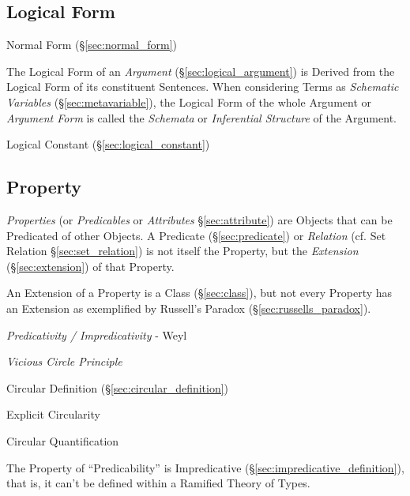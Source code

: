 \subsection{Logical Form}\label{sec:logical_form}

Normal Form (\S\ref{sec:normal_form})

The Logical Form of an \emph{Argument} (\S\ref{sec:logical_argument})
is Derived from the Logical Form of its constituent Sentences. When
considering Terms as \emph{Schematic Variables}
(\S\ref{sec:metavariable}), the Logical Form of the whole Argument or
\emph{Argument Form} is called the \emph{Schemata} or
\emph{Inferential Structure} of the Argument.



Logical Constant (\S\ref{sec:logical_constant})



\subsection{Property}\label{sec:property}

\emph{Properties} (or \emph{Predicables} or \emph{Attributes}
\S\ref{sec:attribute}) are Objects that can be Predicated of other
Objects. A Predicate (\S\ref{sec:predicate}) or \emph{Relation} (cf.
Set Relation \S\ref{sec:set_relation}) is not itself the Property, but
the \emph{Extension} (\S\ref{sec:extension}) of that Property.

An Extension of a Property is a Class (\S\ref{sec:class}), but not
every Property has an Extension as exemplified by Russell's Paradox
(\S\ref{sec:russells_paradox}).

\emph{Predicativity / Impredicativity} - Weyl

\emph{Vicious Circle Principle}

Circular Definition (\S\ref{sec:circular_definition})

Explicit Circularity

Circular Quantification

The Property of ``Predicability'' is Impredicative
(\S\ref{sec:impredicative_definition}), that is, it can't be defined
within a Ramified Theory of Types.\cite{kleene52}

